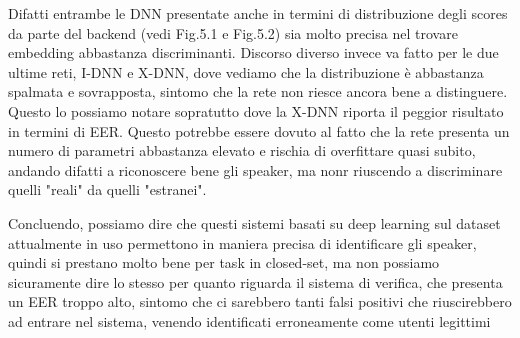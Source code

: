 Difatti entrambe le DNN presentate anche in termini di distribuzione degli scores da parte del backend (vedi Fig.5.1 e Fig.5.2) sia molto precisa
nel trovare embedding abbastanza discriminanti. Discorso diverso invece va fatto per le due ultime reti,
I-DNN e X-DNN, dove vediamo che la distribuzione è abbastanza spalmata e sovrapposta, sintomo che la rete non riesce ancora bene a distinguere. Questo 
lo possiamo notare sopratutto dove la X-DNN riporta il peggior risultato in termini di EER. Questo potrebbe essere dovuto al fatto che la rete
presenta un numero di parametri abbastanza elevato e rischia di overfittare quasi subito, andando difatti a riconoscere bene gli speaker, ma nonr riuscendo
a discriminare quelli "reali" da quelli "estranei". 

Concluendo, possiamo dire che questi sistemi basati su deep learning sul dataset attualmente in uso permettono in maniera precisa di identificare gli speaker,
quindi si prestano molto bene per task in closed-set, ma non possiamo sicuramente dire lo stesso per quanto riguarda il sistema di verifica, che presenta un EER troppo alto,
sintomo che ci sarebbero tanti falsi positivi che riuscirebbero ad entrare nel sistema, venendo identificati erroneamente come utenti legittimi